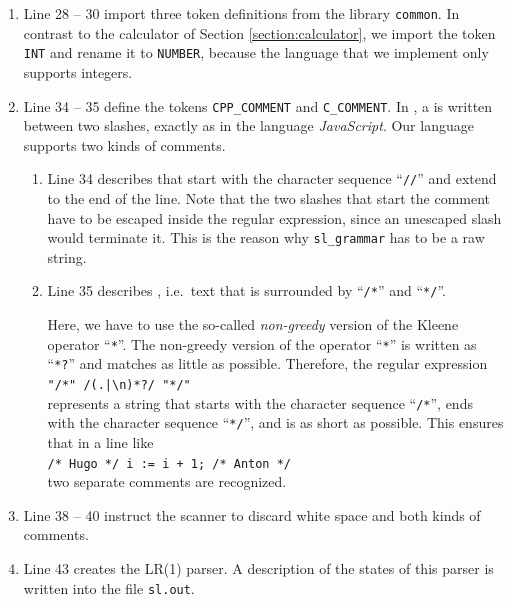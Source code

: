 \begin{enumerate}
      \\[0.2cm]
      \hspace*{1.3cm}
      \texttt{('call', ('IDENTIFIER', $f$), $a_1$, $\cdots$, $a_n$)}.
\item Line 28 -- 30 import three token definitions from the library \texttt{common}.  In contrast to the
      calculator of Section \ref{section:calculator}, we import the token \texttt{INT} and rename it to
      \texttt{NUMBER}, because the language that we implement only supports integers.
\item Line 34 -- 35 define the tokens \texttt{CPP\_COMMENT} and \texttt{C\_COMMENT}.  In ,
      a  is written between two slashes, exactly as in the language
      \textsl{JavaScript}.  Our language supports two kinds of comments.
      \begin{enumerate}
      \item Line 34 describes  that start with the character sequence
            ``\texttt{//}'' and extend to the end of the line.  Note that the two slashes that start the
            comment have to be escaped inside the regular expression, since an unescaped slash would
            terminate it.  This is the reason why \texttt{sl\_grammar} has to be a raw string.
      \item Line 35 describes , i.e.~text that is surrounded by ``\texttt{/*}''
            and ``\texttt{*/}''.

            Here, we have to use the so-called \emph{non-greedy} version of the Kleene operator
            ``\texttt{*}''.  The non-greedy version of the operator ``\texttt{*}'' is written as
            ``\texttt{*?}'' and matches as little as possible.  Therefore, the regular expression
            \\[0.2cm]
            \hspace*{1.3cm}
            \verb$"/*" /(.|\n)*?/ "*/"$ %
            \\[0.2cm]
            represents a string that starts with the character sequence ``\texttt{/*}'', ends with the
            character sequence ``\texttt{*/}'', and is as short as possible.  This ensures that in a line
            like
            \\[0.2cm]
            \hspace*{1.3cm}
            \texttt{/* Hugo */ i := i + 1; /* Anton */}
            \\[0.2cm]
            two separate comments are recognized.
      \end{enumerate}
\item Line 38 -- 40 instruct the scanner to discard white space and both kinds of comments.
\item Line 43 creates the LR(1) parser.  A description of the states of this parser is written into the file
      \texttt{sl.out}.
\end{enumerate}
\FloatBarrier


